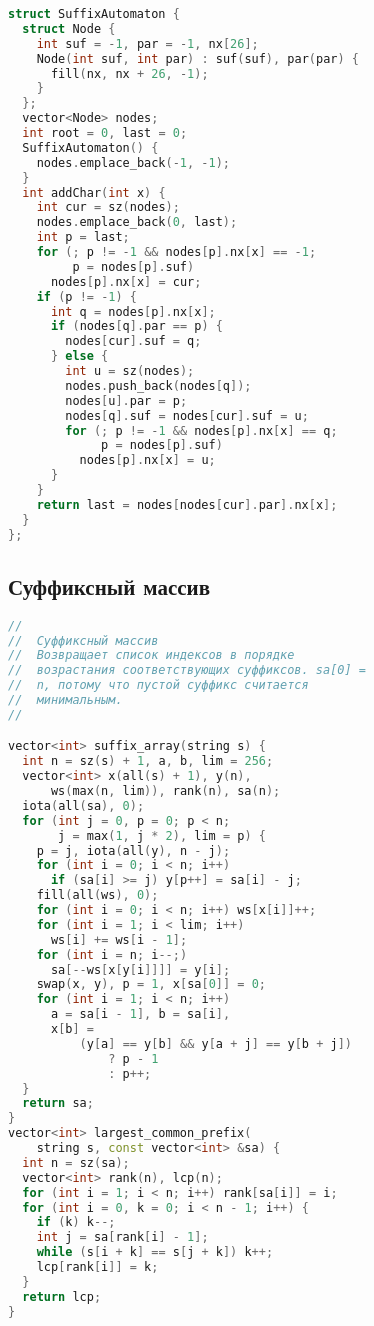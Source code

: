 \documentclass[10pt,a4paper,landscape,twosided]{extarticle}
\begin{document}
\begin{multicols}{3}
\begin{lstlisting}[language=C++]
struct SuffixAutomaton {
  struct Node {
    int suf = -1, par = -1, nx[26];
    Node(int suf, int par) : suf(suf), par(par) {
      fill(nx, nx + 26, -1);
    }
  };
  vector<Node> nodes;
  int root = 0, last = 0;
  SuffixAutomaton() {
    nodes.emplace_back(-1, -1);
  }
  int addChar(int x) {
    int cur = sz(nodes);
    nodes.emplace_back(0, last);
    int p = last;
    for (; p != -1 && nodes[p].nx[x] == -1;
         p = nodes[p].suf)
      nodes[p].nx[x] = cur;
    if (p != -1) {
      int q = nodes[p].nx[x];
      if (nodes[q].par == p) {
        nodes[cur].suf = q;
      } else {
        int u = sz(nodes);
        nodes.push_back(nodes[q]);
        nodes[u].par = p;
        nodes[q].suf = nodes[cur].suf = u;
        for (; p != -1 && nodes[p].nx[x] == q;
             p = nodes[p].suf)
          nodes[p].nx[x] = u;
      }
    }
    return last = nodes[nodes[cur].par].nx[x];
  }
};
\end{lstlisting}

\subsection{Суффиксный массив}
\begin{lstlisting}[language=C++]
//
//  Суффиксный массив
//  Возвращает список индексов в порядке
//  возрастания соответствующих суффиксов. sa[0] =
//  n, потому что пустой суффикс считается
//  минимальным.
//

vector<int> suffix_array(string s) {
  int n = sz(s) + 1, a, b, lim = 256;
  vector<int> x(all(s) + 1), y(n),
      ws(max(n, lim)), rank(n), sa(n);
  iota(all(sa), 0);
  for (int j = 0, p = 0; p < n;
       j = max(1, j * 2), lim = p) {
    p = j, iota(all(y), n - j);
    for (int i = 0; i < n; i++)
      if (sa[i] >= j) y[p++] = sa[i] - j;
    fill(all(ws), 0);
    for (int i = 0; i < n; i++) ws[x[i]]++;
    for (int i = 1; i < lim; i++)
      ws[i] += ws[i - 1];
    for (int i = n; i--;)
      sa[--ws[x[y[i]]]] = y[i];
    swap(x, y), p = 1, x[sa[0]] = 0;
    for (int i = 1; i < n; i++)
      a = sa[i - 1], b = sa[i],
      x[b] =
          (y[a] == y[b] && y[a + j] == y[b + j])
              ? p - 1
              : p++;
  }
  return sa;
}
vector<int> largest_common_prefix(
    string s, const vector<int> &sa) {
  int n = sz(sa);
  vector<int> rank(n), lcp(n);
  for (int i = 1; i < n; i++) rank[sa[i]] = i;
  for (int i = 0, k = 0; i < n - 1; i++) {
    if (k) k--;
    int j = sa[rank[i] - 1];
    while (s[i + k] == s[j + k]) k++;
    lcp[rank[i]] = k;
  }
  return lcp;
}
\end{lstlisting}


\end{multicols}
\end{document}
